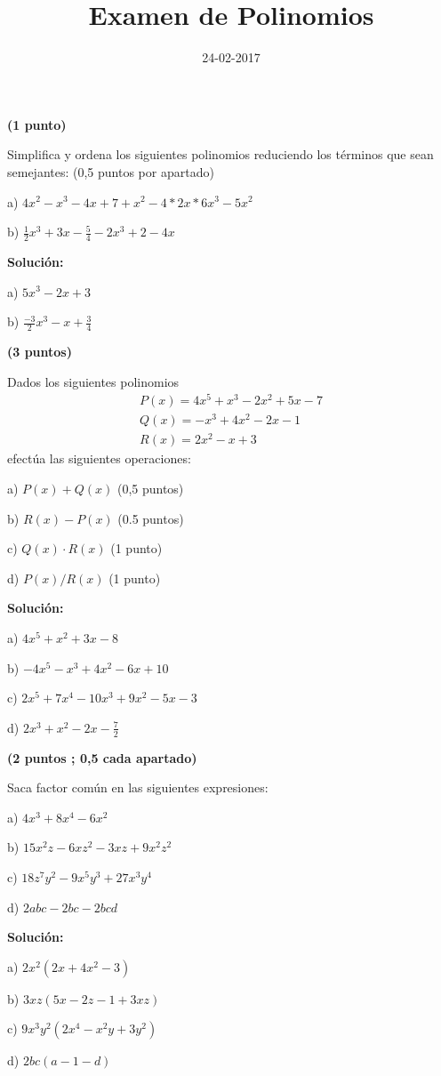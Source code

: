 \documentclass[palatino,noprobframes]{CuartillaSafa}
\title{Examen de Polinomios}
\date{24-02-2017}
\renewcommand{\solution}[1]{\textbf{Solución:}
#1
}
\begin{document}
\cabecera
\pagestyle{fancy}

\begin{problem}\textbf{(1 punto)}

Simplifica y ordena los siguientes polinomios reduciendo los términos que sean semejantes: (0,5 puntos por apartado)

a) $4x^2-x^3-4x+7+x^2-4*2x*6x^3-5x^2$

b) $\frac{1}{2}x^3+3x-\frac{5}{4}-2x^3+2-4x$

\solution{

a) $5x^3-2x+3$

b) $\frac{-3}{2}x^3-x+\frac{3}{4}$

}
\end{problem}

\begin{problem}\textbf{(3 puntos)}

Dados los siguientes polinomios
\begin{align*}
P(x) = 4x^5+x^3-2x^2+5x - 7 \\
Q(x) = -x^3+4x^2-2x-1 \\
R(x) = 2x^2-x+3
\end{align*}
efectúa las siguientes operaciones:

a) $P(x) +Q(x)$ (0,5 puntos)

b) $R(x) - P(x)$ (0.5 puntos)

c) $Q(x)\cdot R(x)$ (1 punto)

d) $P(x)/R(x)$ (1 punto)

\solution{

a) $ 4x^5+x^2+3x-8$

b) $-4x^5-x^3+4x^2-6x+10$

c) $2x^5+7x^4-10x^3+9x^2-5x-3$

d) $ 2x^3+x^2-2x-\frac{7}{2}$


}
\end{problem}

\begin{problem}\textbf{(2 puntos ; 0,5 cada apartado)}

Saca factor común en las siguientes expresiones:

a) $4x^3+8x^4-6x^2$

b) $15x^2z-6xz^2-3xz+9x^2z^2$

c) $18z^7y^2-9x^5y^3+27x^3y^4$

d) $2abc-2bc-2bcd$

\solution{

a) $2x^2(2x+4x^2-3)$

b) $3xz(5x-2z-1+3xz)$

c) $9x^3y^2(2x^4-x^2y+3y^2)$

d) $2bc(a-1-d)$

}
\end{problem}
\end{document}
